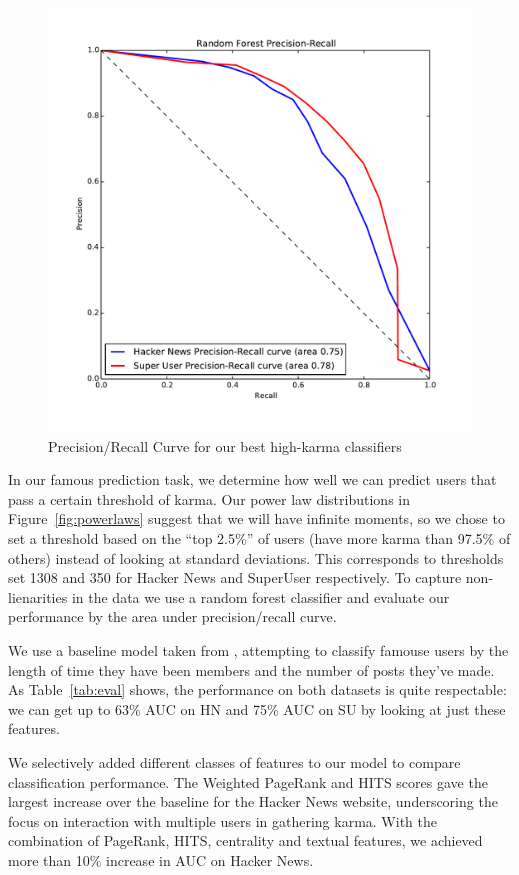 \documentclass[11pt]{article}
\begin{document}
\begin{figure}[h]
\centering
\includegraphics[width=\linewidth]{classification_pr_curve}
\caption{Precision/Recall Curve for our best high-karma classifiers}
\label{fig:classification}
\end{figure}

In our famous prediction task, we determine how well we can predict users that
pass a certain threshold of karma. Our power law distributions in
Figure~\ref{fig:powerlaws} suggest that we will have infinite moments, so we
chose to set a threshold based on the ``top 2.5\%'' of users (have more karma
than 97.5\% of others) instead of looking at standard deviations. This
corresponds to thresholds set 1308 and 350 for Hacker News and SuperUser
respectively.  To capture non-lienarities in the data we use a random forest
classifier and evaluate our performance by the area under precision/recall
curve.

We use a baseline model taken from \citet{movshovitzanalysis}, attempting to
classify famouse users by the length of time they have been members and the
number of posts they've made. As Table~\ref{tab:eval} shows, the performance on
both datasets is quite respectable: we can get up to 63\% AUC on HN and 75\% AUC
on SU by looking at just these features.

We selectively added different classes of features to our model to compare
classification performance. The Weighted PageRank and HITS scores gave the
largest increase over the baseline for the Hacker News website, underscoring the
focus on interaction with multiple users in gathering karma.  With the
combination of PageRank, HITS, centrality and textual features, we achieved more
than 10\% increase in AUC on Hacker News.
\end{document}
